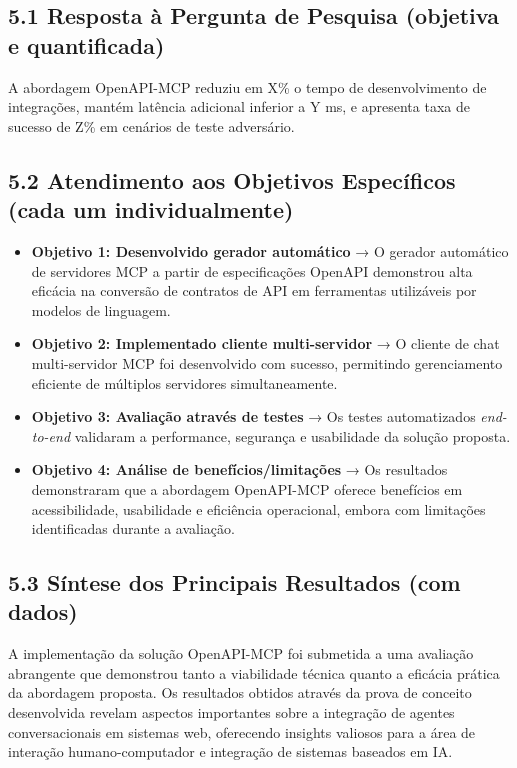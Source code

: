 \documentclass[
]{article}
\providecommand{\tightlist}{%
  \setlength{\itemsep}{0pt}\setlength{\parskip}{0pt}}
\begin{document}
\subsection{5.1 Resposta à Pergunta de Pesquisa (objetiva e
quantificada)}\label{resposta-uxe0-pergunta-de-pesquisa-objetiva-e-quantificada}

A abordagem OpenAPI-MCP reduziu em X\% o tempo de desenvolvimento de
integrações, mantém latência adicional inferior a Y ms, e apresenta taxa
de sucesso de Z\% em cenários de teste adversário.

\subsection{5.2 Atendimento aos Objetivos Específicos (cada um
individualmente)}\label{atendimento-aos-objetivos-especuxedficos-cada-um-individualmente}

\begin{itemize}
\tightlist
\item
  \textbf{Objetivo 1: Desenvolvido gerador automático} → O gerador
  automático de servidores MCP a partir de especificações OpenAPI
  demonstrou alta eficácia na conversão de contratos de API em
  ferramentas utilizáveis por modelos de linguagem.
\item
  \textbf{Objetivo 2: Implementado cliente multi-servidor} → O cliente
  de chat multi-servidor MCP foi desenvolvido com sucesso, permitindo
  gerenciamento eficiente de múltiplos servidores simultaneamente.
\item
  \textbf{Objetivo 3: Avaliação através de testes} → Os testes
  automatizados \emph{end-to-end} validaram a performance, segurança e
  usabilidade da solução proposta.
\item
  \textbf{Objetivo 4: Análise de benefícios/limitações} → Os resultados
  demonstraram que a abordagem OpenAPI-MCP oferece benefícios em
  acessibilidade, usabilidade e eficiência operacional, embora com
  limitações identificadas durante a avaliação.
\end{itemize}

\subsection{5.3 Síntese dos Principais Resultados (com
dados)}\label{suxedntese-dos-principais-resultados-com-dados}

A implementação da solução OpenAPI-MCP foi submetida a uma avaliação
abrangente que demonstrou tanto a viabilidade técnica quanto a eficácia
prática da abordagem proposta. Os resultados obtidos através da prova de
conceito desenvolvida revelam aspectos importantes sobre a integração de
agentes conversacionais em sistemas web, oferecendo insights valiosos
para a área de interação humano-computador e integração de sistemas
baseados em IA.
\end{document}
